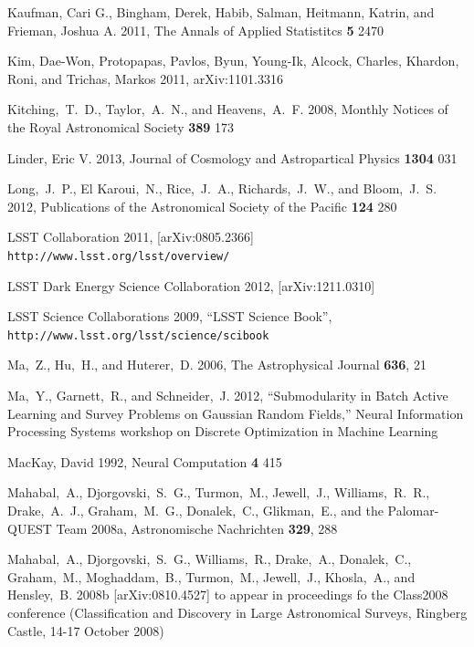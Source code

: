 \documentclass[useAMS,usenatbib,tightenlines,11pt,preprint]{aastex}
\begin{document}
\begin{thebibliography}{99}
Kaufman, Cari G., Bingham, Derek, Habib, Salman, Heitmann, Katrin, and Frieman,
Joshua A. 2011, The Annals of Applied Statistitcs {\bf 5} 2470

Kim, Dae-Won, Protopapas, Pavlos, Byun, Young-Ik, Alcock, Charles, Khardon,
Roni, and Trichas, Markos 2011, arXiv:1101.3316

Kitching,~T.~D., Taylor,~A.~N., and Heavens,~A.~F. 2008,
Monthly Notices of the Royal Astronomical Society {\bf 389} 173

Linder, Eric V. 2013, Journal of Cosmology and Astropartical Physics {\bf 1304}
031

Long,~J.~P., El Karoui,~N., Rice,~J.~A., Richards,~J.~W., and Bloom,~J.~S. 2012,
Publications of the Astronomical Society of the Pacific {\bf 124} 280

LSST Collaboration 2011, [arXiv:0805.2366]
\verb|http://www.lsst.org/lsst/overview/|

LSST Dark Energy Science Collaboration 2012, [arXiv:1211.0310]

LSST Science Collaborations 2009, ``LSST Science Book'',
\verb|http://www.lsst.org/lsst/science/scibook|

Ma,~Z., Hu,~H., and Huterer,~D. 2006, The Astrophysical Journal {\bf 636}, 21

Ma,~Y., Garnett,~R., and Schneider,~J. 2012,
``Submodularity in Batch Active Learning and Survey Problems
on Gaussian Random Fields,''
Neural Information Processing Systems 
workshop on Discrete Optimization in Machine Learning

MacKay, David 1992, Neural Computation {\bf 4} 415

Mahabal,~A., Djorgovski,~S.~G., Turmon,~M., Jewell,~J., Williams,~R.~R.,
Drake,~A.~J., Graham,~M.~G., Donalek,~C., Glikman,~E., and the Palomar-QUEST Team
2008a, Astronomische Nachrichten {\bf 329}, 288

Mahabal,~A., Djorgovski,~S.~G., Williams,~R., Drake,~A., Donalek,~C.,
Graham,~M., Moghaddam,~B., Turmon,~M., Jewell,~J., Khosla,~A., and
Hensley,~B. 2008b [arXiv:0810.4527] to appear in proceedings fo the Class2008
conference (Classification and Discovery in Large Astronomical Surveys, Ringberg
Castle, 14-17 October 2008)


\end{thebibliography}
\end{document}
